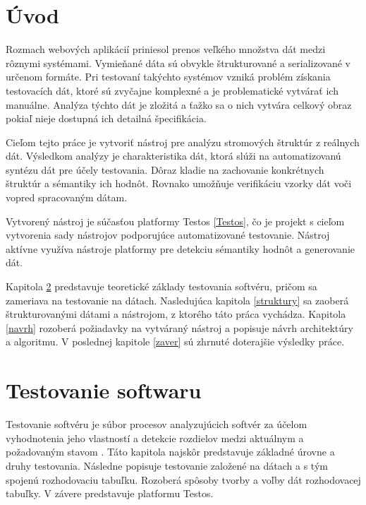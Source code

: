\chapter{Úvod}
Rozmach webových aplikácií priniesol prenos veľkého množstva dát medzi rôznymi systémami. Vymieňané dáta sú obvykle štrukturované a serializované v určenom formáte. Pri testovaní takýchto systémov vzniká problém získania testovacích dát, ktoré sú zvyčajne komplexné a je problematické vytvárať ich manuálne. Analýza týchto dát je zložitá a ťažko sa o nich vytvára celkový obraz pokiaľ nieje dostupná ich detailná špecifikácia. 

Cieľom tejto práce je vytvoriť nástroj pre analýzu stromových štruktúr z reálnych dát. Výsledkom analýzy je charakteristika dát, ktorá slúži na automatizovanú syntézu dát pre účely testovania. Dôraz kladie na zachovanie konkrétnych štruktúr a sémantiky ich hodnôt. Rovnako umožňuje verifikáciu vzorky dát voči vopred spracovaným dátam. 

Vytvorený nástroj je súčasťou platformy Testos \ref{Testos}, čo je projekt s cieľom vytvorenia sady nástrojov podporujúce automatizované testovanie. Nástroj aktívne využíva nástroje platformy pre detekciu sémantiky hodnôt a generovanie dát.   

Kapitola \ref{testing} predstavuje teoretické základy testovania softvéru, pričom sa zameriava na testovanie na dátach. Nasledujúca kapitola \ref{struktury} sa zaoberá štrukturovanými dátami a nástrojom, z ktorého táto práca vychádza. Kapitola \ref{navrh} rozoberá požiadavky na vytváraný nástroj a popisuje návrh architektúry a algoritmu. V poslednej kapitole \ref{zaver} sú zhrnuté doterajšie výsledky práce.   

     


\chapter{Testovanie softwaru}
\label{testing}
Testovanie softvéru je súbor procesov analyzujúcich softvér za účelom vyhodnotenia jeho vlastností a detekcie rozdielov medzi aktuálnym a požadovaným stavom \cite{Standard}. Táto kapitola najskôr predstavuje základné úrovne a druhy testovania. Následne popisuje testovanie založené na dátach a s tým spojenú rozhodovaciu tabuľku. Rozoberá spôsoby tvorby a voľby dát rozhodovacej tabuľky. V závere predstavuje platformu Testos.   

